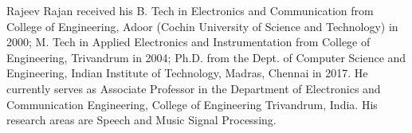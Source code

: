 \documentclass{ieeeaccess}
\begin{document}
\begin{IEEEbiography}{Rajeev Rajan} received his B. Tech in Electronics and Communication from College of Engineering,  Adoor (Cochin University of Science and Technology) in 2000; M. Tech in Applied Electronics and Instrumentation  from  College of Engineering, Trivandrum in 2004; Ph.D. from the Dept.  of Computer Science and Engineering, Indian Institute of Technology, Madras, Chennai in 2017. He currently serves as Associate Professor in the Department of Electronics and Communication Engineering, College of Engineering Trivandrum, India.  His research areas are Speech and  Music Signal Processing.


\end{IEEEbiography}

\EOD
\end{document}
